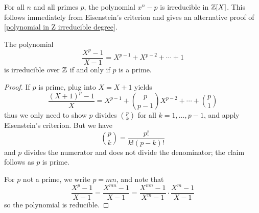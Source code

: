\begin{example}
For all $n$ and all primes $p$, the polynomial $x^n-p$ is irreducible in $\mathbb{Z}[X]$. This follows immediately from Eisenstein's criterion and gives an alternative proof of \cref{polynomial in Z irreducible degree}.
\end{example}
\begin{proposition}
The polynomial
\[\dfrac{X^p-1}{X-1}=X^{p-1}+X^{p-2}+\cdots+1\]
is irreducible over $\mathbb{Z}$ if and only if $p$ is a prime.
\end{proposition}
\begin{proof}
If $p$ is prime, plug into $X=X+1$ yields
\[\dfrac{(X+1)^p-1}{X}=X^{p-1}+\binom{p}{p-1}X^{p-2}+\cdots+\binom{p}{1}\]
thus we only need to show $p$ divides $\binom{p}{k}$ for all $k=1,\dots,p-1$, and apply Eisenstein's criterion. But we have
\[\binom{p}{k}=\dfrac{p!}{k!(p-k)!}\]
and $p$ divides the numerator and does not divide the denominator; the claim follows as $p$ is prime.\par
For $p$ not a prime, we write $p=mn$, and note that
\[\dfrac{X^p-1}{X-1}=\dfrac{X^{mn}-1}{X-1}=\dfrac{X^{mn}-1}{X^m-1}\cdot\dfrac{X^m-1}{X-1}\]
so the polynomial is reducible.
\end{proof}
